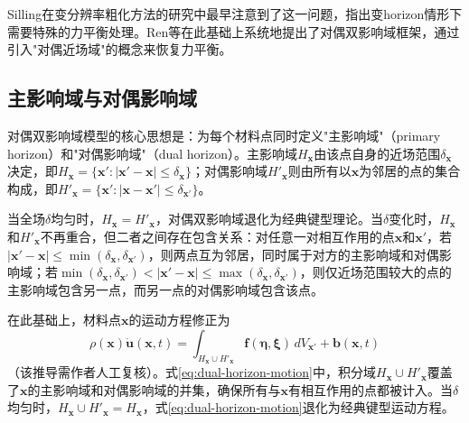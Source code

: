 Silling\cite{Silling2011coarsening}在变分辨率粗化方法的研究中最早注意到了这一问题，指出变horizon情形下需要特殊的力平衡处理。Ren等\cite{Ren2017dualhorizon}在此基础上系统地提出了对偶双影响域框架，通过引入"对偶近场域"的概念来恢复力平衡。

\subsection{主影响域与对偶影响域}\label{sec:dh-primary-dual}

对偶双影响域模型的核心思想是：为每个材料点同时定义"主影响域"（primary horizon）和"对偶影响域"（dual horizon）。主影响域$H_{\mathbf{x}}$由该点自身的近场范围$\delta_{\mathbf{x}}$决定，即$H_{\mathbf{x}}=\{\mathbf{x}':|\mathbf{x}'-\mathbf{x}|\le\delta_{\mathbf{x}}\}$；对偶影响域$H'_{\mathbf{x}}$则由所有以$\mathbf{x}$为邻居的点的集合构成，即$H'_{\mathbf{x}}=\{\mathbf{x}':|\mathbf{x}-\mathbf{x}'|\le\delta_{\mathbf{x}'}\}$。

当全场$\delta$均匀时，$H_{\mathbf{x}}=H'_{\mathbf{x}}$，对偶双影响域退化为经典键型理论。当$\delta$变化时，$H_{\mathbf{x}}$和$H'_{\mathbf{x}}$不再重合，但二者之间存在包含关系：对任意一对相互作用的点$\mathbf{x}$和$\mathbf{x}'$，若$|\mathbf{x}'-\mathbf{x}|\le\min(\delta_{\mathbf{x}},\delta_{\mathbf{x}'})$，则两点互为邻居，同时属于对方的主影响域和对偶影响域；若$\min(\delta_{\mathbf{x}},\delta_{\mathbf{x}'})<|\mathbf{x}'-\mathbf{x}|\le\max(\delta_{\mathbf{x}},\delta_{\mathbf{x}'})$，则仅近场范围较大的点的主影响域包含另一点，而另一点的对偶影响域包含该点。

在此基础上，材料点$\mathbf{x}$的运动方程修正为
\begin{equation}
  \rho(\mathbf{x})\ddot{\mathbf{u}}(\mathbf{x},t)=\int_{H_{\mathbf{x}}\cup H'_{\mathbf{x}}}\mathbf{f}(\boldsymbol{\eta},\boldsymbol{\xi})\,dV_{\mathbf{x}'}+\mathbf{b}(\mathbf{x},t)
  \label{eq:dual-horizon-motion}
\end{equation}
（该推导需作者人工复核）。式\eqref{eq:dual-horizon-motion}中，积分域$H_{\mathbf{x}}\cup H'_{\mathbf{x}}$覆盖了$\mathbf{x}$的主影响域和对偶影响域的并集，确保所有与$\mathbf{x}$有相互作用的点都被计入。当$\delta$均匀时，$H_{\mathbf{x}}\cup H'_{\mathbf{x}}=H_{\mathbf{x}}$，式\eqref{eq:dual-horizon-motion}退化为经典键型运动方程。


